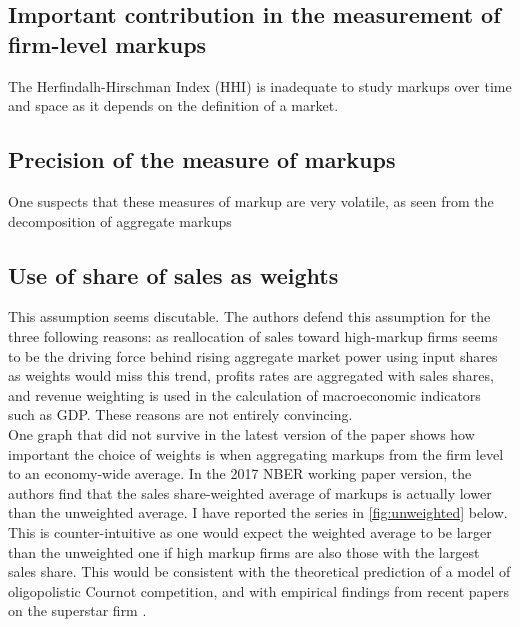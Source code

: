 \documentclass{amsart}
\theoremstyle{definition}
\theoremstyle{remark}
\numberwithin{equation}{section}
\begin{document}
\subsection*{Important contribution in the measurement of firm-level markups} The Herfindalh-Hirschman Index (HHI) is inadequate to study markups over time and space as it depends on the definition of a market. \cite{de2019rise} \\

\subsection*{Precision of the measure of markups} One suspects that these measures of markup are very volatile, as seen from the decomposition of aggregate markups

\subsection*{Use of share of sales as weights} This assumption seems discutable. The authors defend this assumption for the three following reasons: as reallocation of sales toward high-markup firms seems to be the driving force behind rising aggregate market power using input shares as weights would miss this trend, profits rates are aggregated with sales shares, and revenue weighting is used in the calculation of macroeconomic indicators such as GDP. These reasons are not entirely convincing. \\

One graph that did not survive in the latest version of the paper shows how important the choice of weights is when aggregating markups from the firm level to an economy-wide average. In the 2017 NBER working paper version, the authors find that the sales share-weighted average of markups is actually lower than the unweighted average. I have reported the series in \ref{fig:unweighted} below. This is counter-intuitive as one would expect the weighted average to be larger than the unweighted one if high markup firms are also those with the largest sales share. This would be consistent with the theoretical prediction of a model of oligopolistic Cournot competition, and with empirical findings from recent papers on the superstar firm \cite{autor2019fall}.
\end{document}
